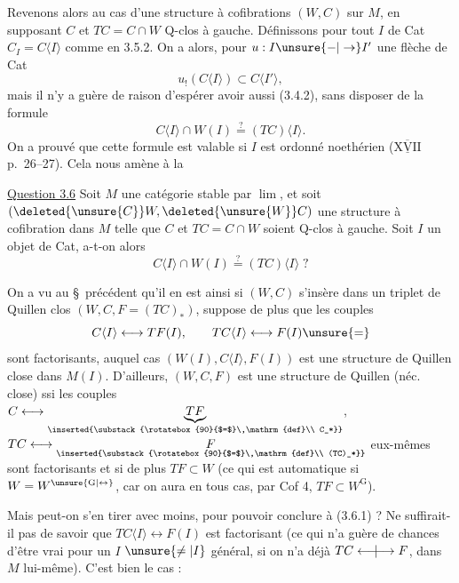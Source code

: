 Revenons alors au cas d'une structure à
cofibrations $(W,C)$ sur $M$, en supposant
$C$ et $TC=C\cap W$ Q-clos à gauche. Définissons
pour tout $I$ de Cat $C_I=C\langle I\rangle$ comme
en 3.5.2. On a alors, pour $u:I\unsure{-|\to}I'$ une
flèche de Cat
\[
 u_!(C\langle I\rangle)\subset C\langle I'\rangle,\tag*{(3.5.4)}
\]
mais il n'y a guère de raison d'espérer
avoir aussi (3.4.2), sans disposer de la
formule
\[
 C\langle I\rangle\cap W(I)\overset{?}{=}(TC)\langle I\rangle.\tag*{(3.5.5)}
\]
On a prouvé que cette formule est valable si $I$
est ordonné noethérien ($\underline{\overline{\mathrm{XVII}}}$  p.~26--27). Cela
nous amène à la

\uline{Question 3.6} Soit $M$ une catégorie stable par  $\lim$,
et soit $(\deleted{\unsure{C}}W,\deleted{\unsure{W}}C)$ une structure à cofibration dans
$M$ telle que $C$ et $TC=C\cap W$ soient Q-clos à gauche.
Soit $I$ un objet de Cat, a-t-on alors
\[
 C\langle I\rangle\cap W(I)\overset{?}{=}(TC)\langle I\rangle\;?\tag*{(3.6.1)}
\]

On a vu au \S\ précédent qu'il en est ainsi
si $(W,C)$ s'insère dans un triplet de
Quillen clos $(W,C,F=(TC)_*)$, 
suppose de plus que les couples
\[
 C\langle I\rangle\longleftrightarrow TF(I),\qquad TC\langle I\rangle\longleftrightarrow F(I)\unsure{=}
\]
sont factorisants, auquel cas $(W(I),C\langle I\rangle,F(I))$
est une structure de Quillen close dans $M(I)$.
D'ailleurs, $(W,C,F)$ est une structure de Quillen
(néc. close) ssi les couples
$C\longleftrightarrow\underset{\inserted{\substack{\rotatebox{90}{$=$}\,\mathrm{def}\\ C_*}}}{\underbrace{TF}}$,
$TC\longleftrightarrow\underset{\inserted{\substack{\rotatebox{90}{$=$}\,\mathrm{def}\\ (TC)_*}}}{F}$
eux-mêmes sont factorisants et si de plus
$TF\subset W$ (ce qui est automatique si $W=W^{\unsure{\mathrm{G}|\leftrightarrow}}$,
car on aura en tous cas, par  Cof 4, $TF\subset W^{\mathrm{G}}$).

Mais peut-on s'en tirer avec moins, pour
pouvoir conclure à (3.6.1) ? Ne suffirait-il
pas de savoir que $TC\langle I\rangle\longleftrightarrow F(I)$ est
factorisant (ce qui n'a guère de chances
d'être vrai pour un $I$ $\unsure{\ne|I}$ général, si on n'a
déjà $TC\mathrel{\longleftarrow\mkern-9mu|\mkern-9mu\longrightarrow}F$,  dans $M$
lui-même). C'est bien le cas :

